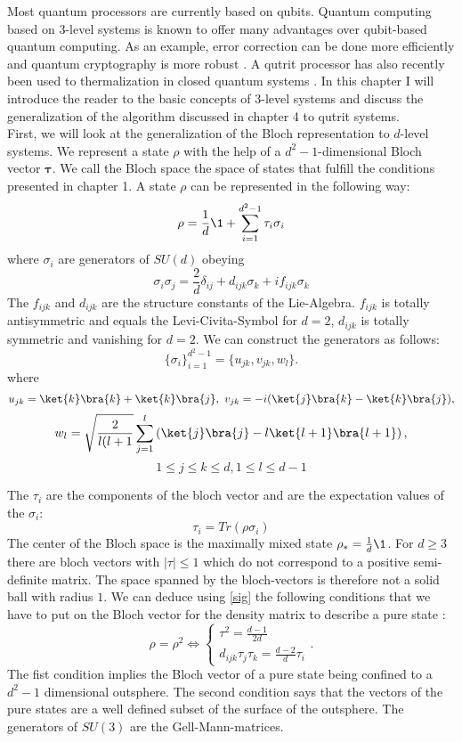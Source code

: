 Most quantum processors are currently based on qubits.
Quantum computing based on $3$-level systems is known to offer many advantages over qubit-based quantum computing.
As an example, error correction can be done more efficiently \cite{campbell14} and quantum cryptography is more robust \cite{bechmann00}.
A qutrit processor has also recently been used to thermalization in closed quantum systems \cite{blok20}.
In this chapter I will introduce the reader to the basic concepts of $3$-level systems and discuss the generalization of the algorithm discussed in chapter 4 to qutrit systems.\\
First, we will look at the generalization of the Bloch representation to $d$-level systems.
We represent a state $\rho$ with the help of a $d^2-1$-dimensional Bloch vector $\bm{\tau}$.
We call the Bloch space the space of states that fulfill the conditions presented in chapter 1.
A state $\rho$ can be represented in the following way:
$$\rho = \frac{1}{d} \1 + \sum_{i=1}^{d^2-1} \tau_i \sigma_i$$
where $\sigma_i$ are generators of $SU(d)$ obeying
\begin{equation}\label{sig}
	\sigma_i\sigma_j = \frac{2}{d}\delta_{ij} + d_{ijk}\sigma_k + if_{ijk}\sigma_k
\end{equation}
The $f_{ijk}$ and $d_{ijk}$ are the structure constants of the Lie-Algebra.
$f_{ijk}$ is totally antisymmetric and equals the Levi-Civita-Symbol for $d=2$, $d_{ijk}$ is totally symmetric and vanishing for $d=2$.
We can construct the generators as follows:\cite{kimura03}
 \[
\{\sigma_i\}^{d^2-1}_{i=1} = \{u_{jk},v_{jk},w_l\}
.\]
where
$$
	u_{jk} = \ket{k}\bra{k}+\ket{k}\bra{j}, ~ v_{jk} = -i(\ket{j}\bra{k}-\ket{k}\bra{j}),
$$
$$
	w_l = \sqrt{\frac{2}{l(l+1}} \sum_{j=1}^{l} \left( \ket{j}\bra{j}-l\ket{l+1}\bra{l+1} \right),$$
	$$ 1\le j\le k\le d, 1\le l\le d-1$$

The $\tau_i$ are the components of the bloch vector and are the expectation values of the $\sigma_i$:
$$
	 \tau_i = Tr(\rho\sigma_i)
$$
The center of the Bloch space is the maximally mixed state $\rho_{*}=\frac{1}{d}\1$.
For $d\ge3$ there are bloch vectors with $\left|\tau\right|\le 1$ which do not correspond to a positive semi-definite matrix.
The space spanned by the bloch-vectors is therefore not a solid ball with radius $1$.
We can deduce using \eqref{sig} the following conditions that we have to put on the Bloch vector for the density matrix to describe a pure state \cite{bengtsson17}:
\[
\rho=\rho^2\Leftrightarrow \begin{cases}
	\tau^2=\frac{d-1}{2d}\\
	d_{ijk}\tau_j\tau_k=\frac{d-2}{d}\tau_i
\end{cases}
.\]
The fist condition implies the Bloch vector of a pure state being confined to a $d^2-1$ dimensional outsphere.
The second condition says that the vectors of the pure states are a well defined subset of the surface of the outsphere.
The generators of  $SU(3)$ are the Gell-Mann-matrices. \\
